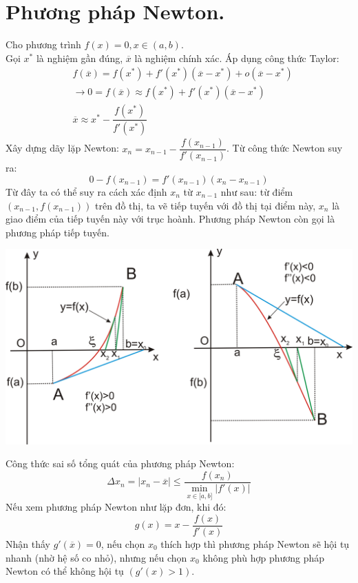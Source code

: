 \documentclass[12pt, a4paper]{report}
\begin{document}
\section{Phương pháp Newton.}
Cho phương trình $f(x) = 0, x \in (a,b)$. \\
Gọi $x^*$ là nghiệm gần đúng, $\overline{x}$ là nghiệm chính xác. Áp dụng công thức Taylor:
\[
    \begin{aligned}
        & f(\overline{x}) = f(x^*) + f'(x^*)(\overline{x}-x^*) + o(\overline{x}-x^*)\\
        & \longrightarrow 0 = f(\overline{x}) \approx f(x^*) + f'(x^*)(\overline{x}-x^*)\\
        & \overline{x} \approx x^* - \dfrac{f(x^*)}{f'(x^*)}
    \end{aligned}    
\]
Xây dựng dãy lặp Newton: $x_n = x_{n-1} - \dfrac{f(x_{n-1})}{f'(x_{n-1})}$. Từ công thức Newton suy ra: 
\[
    0 - f(x_{n-1}) = f'(x_{n-1})(x_n - x_{n-1})
\]
Từ đây ta có thể suy ra cách xác định $x_n$ từ $x_{n-1}$ như sau: từ điểm $(x_{n-1},f(x_{n-1}))$ trên đồ thị, ta vẽ tiếp tuyến với đồ thị tại điểm này, $x_{n}$ là giao điểm của tiếp tuyến này với trục hoành. Phương pháp Newton còn gọi là phương pháp tiếp tuyến.
\begin{center}
    \includegraphics[scale = 0.35]{4.png}
\end{center}
Công thức sai số tổng quát của phương pháp Newton:
\[
    \Delta x_n = |x_n - \overline{x}| \leq \frac{f(x_n)}{\displaystyle\min_{x \in \lbrack a,b \rbrack} |f'(x)|}    
\]
Nếu xem phương pháp Newton như lặp đơn, khi đó: 
\[
    g(x) = x - \frac{f(x)}{f'(x)} 
\]
Nhận thấy $g'(\overline{x}) = 0$, nếu chọn $x_0$ thích hợp thì phương pháp Newton sẽ hội tụ nhanh (nhờ hệ số co nhỏ), nhưng nếu chọn $x_0$ không phù hợp phương pháp Newton có thể không hội tụ $(g'(x)>1)$.
\newpage
\end{document}
